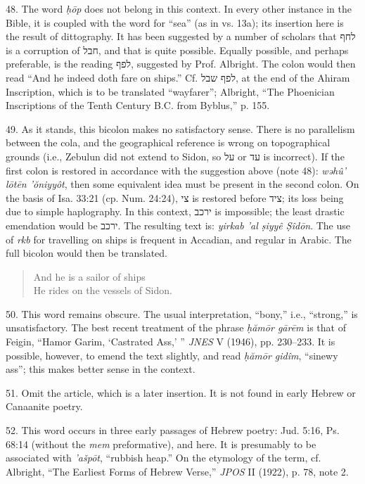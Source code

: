 \begin{enumerate}
48. The word \emph{ḥōp} does not belong in this context. In every other
instance in the Bible, it is coupled with the word for ``sea'' (as in vs.
13a); its insertion here is the result of dittography. It has been suggested
by a number of scholars that לחף is a corruption of חבל, and that is quite
possible. Equally possible, and perhaps preferable, is the reading לפף,
suggested by Prof. Albright. The colon would then read ``And he indeed doth
fare on ships.'' Cf. לפף שבל, at the end of the Ahiram Inscription, which is
to be translated ``wayfarer''; Albright, ``The Phoenician Inscriptions of the
Tenth Century B.C. from Byblus,'' p. 155.

49. As it stands, this bicolon makes no satisfactory sense. There is no
parallelism between the cola, and the geographical reference is wrong on
topographical grounds (i.e., Zebulun did not extend to Sidon, so על or עד is
incorrect). If the first colon is restored in accordance with the suggestion
above (note 48): \emph{wəhû' lōtēn 'ŏniyyôt}, then some equivalent idea must
be present in the second colon. On the basis of Isa. 33:21 (cp. Num. 24:24),
צי is restored before ציד; its loss being due to simple haplography. In this
context, ירכב is impossible; the least drastic emendation would be ירכב. The
resulting text is: \emph{yirkab 'al ṣiyyê Ṣîdōn}. The use of \emph{rkb} for
travelling on ships is frequent in Accadian, and regular in Arabic. The full
bicolon would then be translated.

\begin{quote}
And he is a sailor of ships\\
He rides on the vessels of Sidon.
\end{quote}

50. This word remains obscure. The usual interpretation, ``bony,'' i.e.,
``strong,'' is unsatisfactory. The best recent treatment of the phrase
\emph{ḥămōr gārēm} is that of Feigin, ``Hamor Garim, `Castrated Ass,' ''
\emph{JNES} V (1946), pp. 230--233. It is possible, however, to emend the text
slightly, and read \emph{ḥămōr gidîm}, ``sinewy ass''; this makes better sense
in the context.

51. Omit the article, which is a later insertion. It is not found in early
Hebrew or Canaanite poetry.

52. This word occurs in three early passages of Hebrew poetry: Jud. 5:16,
Ps. 68:14 (without the \emph{mem} preformative), and here. It is presumably to
be associated with \emph{'ašpōt}, ``rubbish heap.'' On the etymology of the
term, cf. Albright, ``The Earliest Forms of Hebrew Verse,'' \emph{JPOS} II
(1922), p. 78, note 2.


\end{enumerate}
